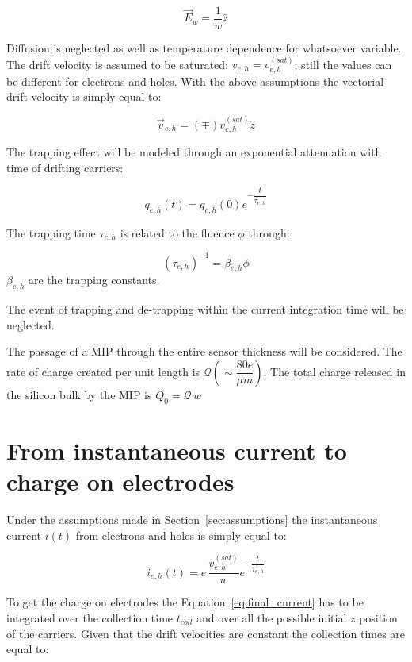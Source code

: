 \begin{equation}
\vec{E}_w=\dfrac{1}{w}\hat{z}
\end{equation}

Diffusion is neglected as well as temperature dependence for whatsoever variable. 
The drift velocity is assumed to be saturated: $v_{e,h}=v^{(sat)}_{e,h}$; still the values can be different for electrons and holes. 
With the above assumptions the vectorial drift velocity is simply equal to:

\begin{equation}
\vec{v}_{e,h}=(\mp)v^{(sat)}_{e,h}\hat{z}
\end{equation}

The trapping effect will be modeled through an exponential attenuation with time of drifting carriers:

\begin{equation}
q_{e,h}(t) = q_{e,h}(0)e^{-\dfrac{t}{\tau_{e,h}}}
\end{equation}

The trapping time $\tau_{e,h}$ is related to the fluence $\phi$ through:

\begin{equation}
(\tau_{e,h})^{-1}=\beta_{e,h}\phi
\end{equation}
$\beta_{e,h}$ are the trapping constants.

The event of trapping and de-trapping within the current integration time will be neglected.

The passage of a MIP through the entire sensor thickness will be considered. The 
rate of charge created per unit length is $\mathcal{Q} (\sim \dfrac{80e}{\mu m})$. The total charge 
released in the silicon bulk by the MIP is $Q_0=\mathcal{Q}\,w$

\section{From instantaneous current to charge on electrodes}
\label{sec:charge}
Under the assumptions made in Section~\ref{sec:assumptions} the instantaneous current $i(t)$ 
from electrons and holes is simply equal to:

\begin{equation}
i_{e,h}(t)=e\,\dfrac{v^{(sat)}_{e,h}}{w}e^{-\dfrac{t}{\tau_{e,h}}}
\label{eq:final_current}
\end{equation}

To get the charge on electrodes the Equation~\ref{eq:final_current} has to be integrated over the collection time $t_{coll}$ and over all the possible initial $z$ position of the carriers.
Given that the drift velocities are constant the collection times are equal to:

